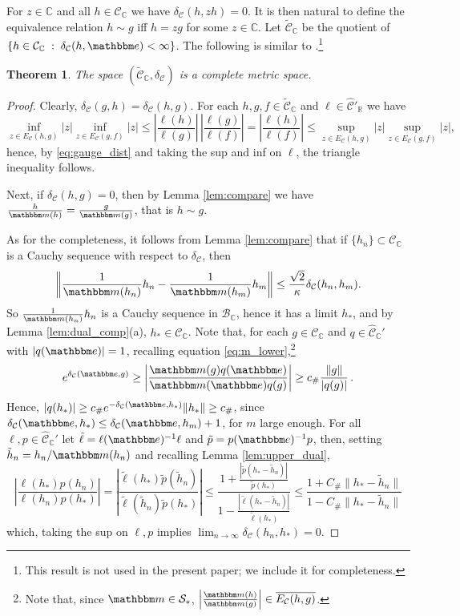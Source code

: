 \documentclass{amsart}
\numberwithin{equation}{section}
\newtheorem{thm}{Theorem}[section]
\newcommand\cB{{\mathcal B}}
\newcommand\cC{{\mathcal C}}
\newcommand\cS{{\mathcal S}}
\newcommand\bC{{\mathbb C}}
\newcommand\bR{{\mathbb R}}
\newcommand{\bbe}{\mathbbm e}
\newcommand{\bbm}{\mathbbm m}
\newcommand{\Const}{C_{\#}}
\newcommand{\const}{c_{\#}}
\begin{document}
For $z\in\bC$ and all $h\in\cC_\bC$ we have $\delta_\cC(h,z h)=0$. It is then natural to define the equivalence relation $h\sim g$ iff $h=zg$ for some $z\in\bC$. Let $\widetilde \cC_{\bC}$ be the quotient of $\{h\in\cC_\bC\;:\; \delta_\cC(h,\bbe)<\infty\}$.
The following is similar to \cite[Theorem 3.1]{Du11}.\footnote{This result is not used in the present paper; we include it for completeness.}
\begin{thm}\label{thm:complete}
The space $(\widetilde \cC_{\bC}, \delta_\cC)$ is a complete metric space.
\end{thm}
\begin{proof}
Clearly, $\delta_\cC(g,h)=\delta_\cC(h,g)$. For each $h,g,f\in \widetilde \cC_{\bC}$ and $\ell\in\hat \cC'_{\bR}$ we have
\[
\inf_{z\in E_\cC(h,g)}|z|\inf_{z\in E_\cC(g,f)}|z|\leq\left|\frac{\ell(h)}{\ell(g)}\right|\,\left|\frac{\ell(g)}{\ell(f)}\right|=\left|\frac{\ell(h)}{\ell(f)}\right|\leq \sup_{z\in E_\cC(h,g)}|z|\sup_{z\in E_\cC(g,f)}|z|,
\]
hence, by \eqref{eq:gauge_dist} and taking the sup and inf on $\ell$, the triangle inequality follows. 

Next, if $\delta_\cC(h,g)=0$, then by Lemma \ref{lem:compare} we have $\frac{h}{\bbm(h)}=\frac{g}{\bbm(g)}$,  that is $h\sim g$.

As for the completeness, it follows from Lemma \ref{lem:compare} that if $\{h_n\}\subset\cC_{\bC}$ is a Cauchy sequence with respect to $\delta_\cC$, then
\[
\left\|\frac{1}{\bbm(h_n)}h_n- \frac{1}{\bbm(h_m)}h_m\right\|\leq \frac{\sqrt2}{\kappa}\delta_{\cC}(h_n,h_m).
\]
So $\frac{1}{\bbm(h_n)}h_n$ is a Cauchy sequence in $\cB_{\bC}$, hence it has a limit $h_*$, and by Lemma \ref{lem:dual_comp}(a), $h_*\in\cC_{\bC}$. 
Note that, for each $g\in\cC_\bC$ and $q\in\hat \cC_\bC'$ with $|q(\bbe)|=1$, recalling equation \eqref{eq:m_lower},\footnote{Note that, since $\bbm\in\cS_*$, $\left|\frac{\bbm(h)}{\bbm(g)}\right|\in \overline{E_{\cC}(h,g)}$.}
\[
e^{\delta_{\cC}(\bbe,g)}\geq \left|\frac{\bbm(g) q(\bbe)}{\bbm(\bbe)q(g)}\right|\geq \const \frac{\|g\| }{|q(g)|} \, .
\]
Hence, $|q(h_*)|\geq \const e^{-\delta_{\cC}(\bbe,h_*)}\|h_*\|\geq \const$, since $\delta_{\cC}(\bbe,h_*)\leq \delta_{\cC}(\bbe,h_m)+1$, for $m$ large enough.
For all $\ell, p\in\hat\cC_{\bC}'$ let $\tilde \ell=\ell(\bbe)^{-1}\ell$ and $\tilde p=p(\bbe)^{-1}p$, then, 
setting $\tilde h_n = h_n/\bbm(h_n)$ and recalling Lemma \ref{lem:upper_dual},
\[
\left|\frac{\ell(h_*)p(h_n)}{\ell(h_n)p(h_*)}\right|=\left|\frac{\tilde \ell(h_*)\tilde p(\tilde h_n )}{\tilde \ell(\tilde h_n)\tilde p(h_*)}\right|\leq \frac{1+\frac{|\tilde p(h_*- \tilde h_n)|}{\tilde p(h_*)}}{1-\frac{|\tilde \ell(h_*- \tilde h_n)|}{\tilde \ell(h_*)}}\leq \frac{1+\Const \|h_*- \tilde h_n \|}{1-\Const \|h_*- \tilde h_n \|}
\]
which, taking the sup on $\ell,p$ implies $\lim_{n\to\infty}\delta_\cC(h_n,h_*)=0$.
\end{proof}
\end{document}
